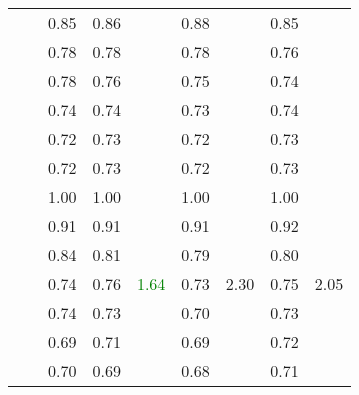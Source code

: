\begin{table}
\begin{tabular}{ccccccccc}
		& & 0.85 & 0.86 & & 0.88 & & 0.85 & \\
		& & 0.78 & 0.78 & & 0.78 & & 0.76 & \\
		& & 0.78 & 0.76 & & 0.75 & & 0.74 & \\
		& & 0.74 & 0.74 & & 0.73 & & 0.74 & \\
		& & 0.72 & 0.73 & & 0.72 & & 0.73 & \\
		& & 0.72 & 0.73 & & 0.72 & & 0.73 & \\
		\cline{2-9}
		& \multirow{7}{*}{\rotatebox[origin=c]{90}{\ac{fcgm} - interface}}& 1.00 & 1.00 & \multirow{7}{*}{\textcolor{green}{1.64}} & 1.00 & \multirow{7}{*}{2.30} & 1.00 & \multirow{7}{*}{2.05} \\
		& & 0.91 & 0.91 & & 0.91 & & 0.92 & \\
		& & 0.84 & 0.81 & & 0.79 & & 0.80 & \\
		& & 0.74 & 0.76 & & 0.73 & & 0.75 & \\
		& & 0.74 & 0.73 & & 0.70 & & 0.73 & \\
		& & 0.69 & 0.71 & & 0.69 & & 0.72 & \\
		& & 0.70 & 0.69 & & 0.68 & & 0.71 & \\
		\bottomrule
	\end{tabular}
\end{table}

